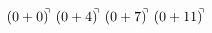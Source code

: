 \documentclass[preview]{standalone}
\begin{document}
\begin{align*}
(0+0)^{\hspace{-0.1cm}\urcorner} \ (0+4)^{\hspace{-0.1cm}\urcorner} \ (0+7)^{\hspace{-0.1cm}\urcorner} \ (0+11)^{\hspace{-0.1cm}\urcorner}
\end{align*}
\end{document}
